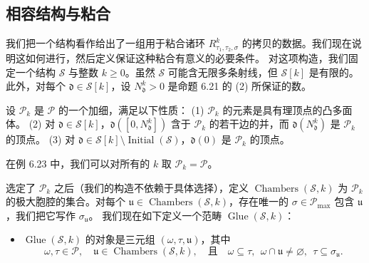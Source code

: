 \subsection{相容结构与粘合}
我们把一个结构看作给出了一组用于粘合诸环 $R^k_{\tau_1,\tau_2,\sigma}$ 的拷贝的数据。我们现在说明这如何进行，然后定义保证这种粘合有意义的必要条件。
对这项构造，我们固定一个结构 $\mathcal{S}$ 与整数 $k\ge0$。虽然 $\mathcal{S}$ 可能含无限多条射线，但 $\mathcal{S}[k]$ 是有限的。此外，对每个 $\mathfrak{d}\in\mathcal{S}[k]$，设 $N^k_{\mathfrak{d}}>0$ 是命题 6.21 的 (2) 所保证的数。

\begin{definition}
设 $\mathcal{P}_k$ 是 $\mathcal{P}$ 的一个加细，满足以下性质：
(1) $\mathcal{P}_k$ 的元素是具有理顶点的凸多面体。
(2) 对 $\mathfrak{d}\in\mathcal{S}[k]$，$\mathfrak{d}([0,N^k_{\mathfrak{d}}])$ 含于 $\mathcal{P}_k$ 的若干边的并，而 $\mathfrak{d}(N^k_{\mathfrak{d}})$ 是 $\mathcal{P}_k$ 的顶点。
(3) 对 $\mathfrak{d}\in\mathcal{S}[k]\setminus\operatorname{Initial}(\mathcal{S})$，$\mathfrak{d}(0)$ 是 $\mathcal{P}_k$ 的顶点。
\end{definition}

\begin{example}
在例 6.23 中，我们可以对所有的 $k$ 取 $\mathcal{P}_k=\mathcal{P}$。
\end{example}

选定了 $\mathcal{P}_k$ 之后（我们的构造不依赖于具体选择），定义 $\operatorname{Chambers}(\mathcal{S},k)$ 为 $\mathcal{P}_k$ 的极大胞腔的集合。对每个 $\mathfrak{u}\in\operatorname{Chambers}(\mathcal{S},k)$，存在唯一的 $\sigma\in\mathcal{P}_{\max}$ 包含 $\mathfrak{u}$，我们把它写作 $\sigma_{\mathfrak{u}}$。
我们现在如下定义一个范畴 $\operatorname{Glue}(\mathcal{S},k)$：
\begin{itemize}[leftmargin=2em]
\item $\operatorname{Glue}(\mathcal{S},k)$ 的对象是三元组 $(\omega,\tau,\mathfrak{u})$，其中
\[
\omega,\tau\in\mathcal{P},\quad \mathfrak{u}\in\operatorname{Chambers}(\mathcal{S},k),\quad \text{且}\quad \omega\subseteq\tau,\ \ \omega\cap\mathfrak{u}\neq\varnothing,\ \ \tau\subseteq\sigma_{\mathfrak{u}}.
\]
\end{itemize}
